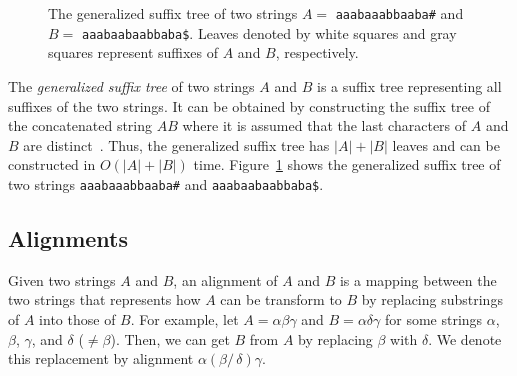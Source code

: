 \documentclass{llncs}
\newcommand{\partitle}[1]{}                        \newcommand{\commentout}[1]{}
\begin{document}
\begin{figure}[t]
{
 }
\caption{The generalized suffix tree of two strings
  $A=$ {\tt aaabaaabbaaba\#} and $B=$ {\tt aaabaabaabbaba\$}.
 Leaves denoted by white squares and gray squares
  represent suffixes of $A$ and $B$, respectively.
\label{fig:GST}}
\end{figure}


\partitle{Generalized ST}

The {\em generalized suffix tree} of two strings $A$ and $B$
 is a suffix tree representing all suffixes of the two strings.
It can be obtained
 by constructing the suffix tree of the concatenated string $AB$
 where it is assumed that the last characters of $A$ and $B$
  are distinct~\cite{Amir&Farach:94,Gusfield:97}.
Thus, the generalized suffix tree has $|A|+|B|$ leaves
 and can be constructed in $O(|A|+|B|)$ time.
Figure~\ref{fig:GST} shows the generalized suffix tree of
 two strings {\tt aaabaaabbaaba\#} and {\tt aaabaabaabbaba\$}.



\subsection{Alignments}
\label{subsec:Alignments}


\partitle{definition}

Given two strings $A$ and $B$,
 an alignment of $A$ and $B$ is a mapping between the two strings that
 represents how $A$ can be transform to $B$ by replacing substrings of $A$ into those of $B$.
For example,
 let $A= \alpha \beta \gamma$ and $B= \alpha \delta \gamma$
for some strings $\alpha$, $\beta$, $\gamma$, and $\delta$ ($\neq \beta$).
Then, we can get $B$ from $A$ by replacing $\beta$ with $\delta$.
We denote this replacement by alignment $\alpha (\beta /\, \delta) \gamma$.


\partitle{general form}
\end{document}
